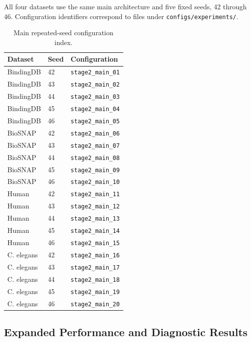 All four datasets use the same main architecture and five fixed seeds, 42
through 46. Configuration identifiers correspond to files under
\texttt{configs/experiments/}.

\begin{table}[!htbp]
\centering
\caption{Main repeated-seed configuration index.}
\label{tab:si_run_matrix}
\scriptsize
\setlength{\tabcolsep}{5pt}
\begin{tabular}{lll}
\toprule
Dataset & Seed & Configuration \\
\midrule
BindingDB & 42 & \texttt{stage2\_main\_01} \\
BindingDB & 43 & \texttt{stage2\_main\_02} \\
BindingDB & 44 & \texttt{stage2\_main\_03} \\
BindingDB & 45 & \texttt{stage2\_main\_04} \\
BindingDB & 46 & \texttt{stage2\_main\_05} \\
BioSNAP & 42 & \texttt{stage2\_main\_06} \\
BioSNAP & 43 & \texttt{stage2\_main\_07} \\
BioSNAP & 44 & \texttt{stage2\_main\_08} \\
BioSNAP & 45 & \texttt{stage2\_main\_09} \\
BioSNAP & 46 & \texttt{stage2\_main\_10} \\
Human & 42 & \texttt{stage2\_main\_11} \\
Human & 43 & \texttt{stage2\_main\_12} \\
Human & 44 & \texttt{stage2\_main\_13} \\
Human & 45 & \texttt{stage2\_main\_14} \\
Human & 46 & \texttt{stage2\_main\_15} \\
C. elegans & 42 & \texttt{stage2\_main\_16} \\
C. elegans & 43 & \texttt{stage2\_main\_17} \\
C. elegans & 44 & \texttt{stage2\_main\_18} \\
C. elegans & 45 & \texttt{stage2\_main\_19} \\
C. elegans & 46 & \texttt{stage2\_main\_20} \\
\bottomrule
\end{tabular}
\end{table}

\subsection{Expanded Performance and Diagnostic Results}

